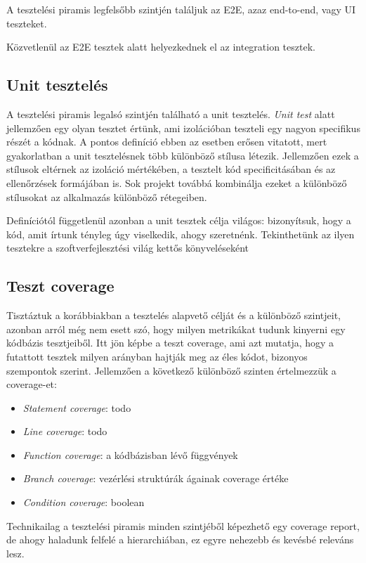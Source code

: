 A tesztelési piramis legfelsőbb szintjén találjuk az E2E, azaz end-to-end, vagy UI teszteket.

Közvetlenül az E2E tesztek alatt helyezkednek el az integration tesztek.

\subsection{Unit tesztelés}

A tesztelési piramis legalsó szintjén található a unit tesztelés. \textit{Unit test} alatt jellemzően egy olyan tesztet értünk, ami izolációban teszteli egy nagyon specifikus részét a kódnak. A pontos definíció ebben az esetben erősen vitatott, mert gyakorlatban a unit tesztelésnek több különböző stílusa létezik. Jellemzően ezek a stílusok eltérnek az izoláció mértékében, a tesztelt kód specificitásában és az ellenőrzések formájában is. Sok projekt továbbá kombinálja ezeket a különböző stílusokat az alkalmazás különböző rétegeiben.

Definíciótól függetlenül azonban a unit tesztek célja világos: bizonyítsuk, hogy a kód, amit írtunk tényleg úgy viselkedik, ahogy szeretnénk. Tekinthetünk az ilyen tesztekre a szoftverfejlesztési világ kettős könyveléseként

\subsection{Teszt coverage}

Tisztáztuk a korábbiakban a tesztelés alapvető célját és a különböző szintjeit, azonban arról még nem esett szó, hogy milyen metrikákat tudunk kinyerni egy kódbázis tesztjeiből. Itt jön képbe a teszt coverage, ami azt mutatja, hogy a futattott tesztek milyen arányban hajtják meg az éles kódot, bizonyos szempontok szerint. Jellemzően a következő különböző szinten értelmezzük a coverage-et:
\begin{itemize}
    \item \textit{Statement coverage}: todo
    \item \textit{Line coverage}: todo
    \item \textit{Function coverage}: a kódbázisban lévő függvények
    \item \textit{Branch coverage}: vezérlési struktúrák ágainak coverage értéke
    \item \textit{Condition coverage}: boolean
\end{itemize}

Technikailag a tesztelési piramis minden szintjéből képezhető egy coverage report, de ahogy haladunk felfelé a hierarchiában, ez egyre nehezebb és kevésbé releváns lesz.

